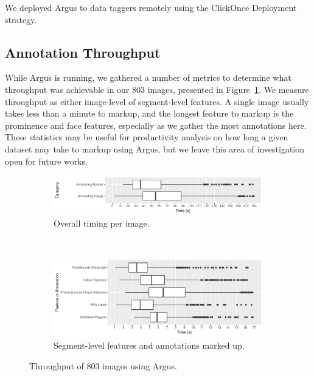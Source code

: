 We deployed Argus to data taggers remotely using the ClickOnce Deployment strategy.

\clearpage

\subsection{Annotation Throughput}
\label{sec:dataset:argus:metrics}

While Argus is running, we gathered a number of metrics to determine what throughput was achievable in our 803 images, presented in  Figure~\ref{fig:dataset:argus:metrics:throughput}. We measure throughput as either image-level of segment-level features. A single image usually takes less than a minute to markup, and the longest feature to markup is the prominence and face features, especially as we gather the most annotations here. These statistics may be useful for productivity analysis on how long a given dataset may take to markup using Argus, but we leave this area of investigation open for future works.

\begin{figure}[h]
  \begin{subfigure}[b]{\textwidth}
    \includegraphics[width=\textwidth]{images/dataset/argus/photo_box_plots}
    \caption{Overall timing per image.}   
  \end{subfigure}
  \smallskip
  \\
  \begin{subfigure}[b]{\textwidth}
    \includegraphics[width=\textwidth]{images/dataset/argus/feature_box_plots}
    \caption{Segment-level features and annotations marked up.}   
  \end{subfigure}
  \caption[Throughput of images using Argus]{Throughput of 803 images using Argus.}
  \label{fig:dataset:argus:metrics:throughput}
\end{figure}

